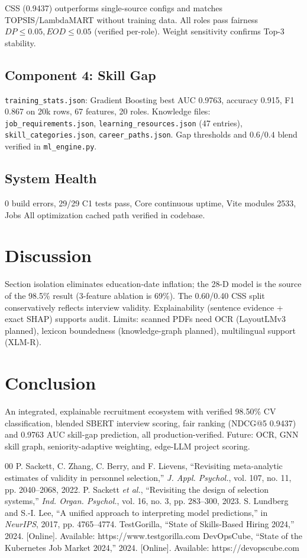 \documentclass[conference]{IEEEtran}
\begin{document}
CSS (0.9437) outperforms single-source configs and matches TOPSIS/LambdaMART without training data. All roles pass fairness $DP\le0.05, EOD\le0.05$ (verified per-role). Weight sensitivity confirms Top-3 stability.

\subsection{Component 4: Skill Gap}
\texttt{training\_stats.json}: Gradient Boosting best AUC 0.9763, accuracy 0.915, F1 0.867 on 20k rows, 67 features, 20 roles. Knowledge files: \texttt{job\_requirements.json}, \texttt{learning\_resources.json} (47 entries), \texttt{skill\_categories.json}, \texttt{career\_paths.json}. Gap thresholds and $0.6/0.4$ blend verified in \texttt{ml\_engine.py}.

\subsection{System Health}
0 build errors, 29/29 C1 tests pass, Core continuous uptime, Vite modules 2533, Jobs All optimization cached path verified in codebase.

\section{Discussion}
Section isolation eliminates education-date inflation; the 28-D model is the source of the 98.5\% result (3-feature ablation is 69\%). The 0.60/0.40 CSS split conservatively reflects interview validity. Explainability (sentence evidence + exact SHAP) supports audit. Limits: scanned PDFs need OCR (LayoutLMv3 planned), lexicon boundedness (knowledge-graph planned), multilingual support (XLM-R).

\section{Conclusion}
An integrated, explainable recruitment ecosystem with verified 98.50\% CV classification, blended SBERT interview scoring, fair ranking (NDCG@5 0.9437) and 0.9763 AUC skill-gap prediction, all production-verified. Future: OCR, GNN skill graph, seniority-adaptive weighting, edge-LLM project scoring.

\begin{thebibliography}{00}
 P. Sackett, C. Zhang, C. Berry, and F. Lievens, ``Revisiting meta-analytic estimates of validity in personnel selection,'' \textit{J. Appl. Psychol.}, vol. 107, no. 11, pp. 2040--2068, 2022.
 P. Sackett \textit{et al.}, ``Revisiting the design of selection systems,'' \textit{Ind. Organ. Psychol.}, vol. 16, no. 3, pp. 283--300, 2023.
 S. Lundberg and S.-I. Lee, ``A unified approach to interpreting model predictions,'' in \textit{NeurIPS}, 2017, pp. 4765--4774.
 TestGorilla, ``State of Skills-Based Hiring 2024,'' 2024. [Online]. Available: https://www.testgorilla.com
 DevOpsCube, ``State of the Kubernetes Job Market 2024,'' 2024. [Online]. Available: https://devopscube.com
\end{thebibliography}
\end{document}
